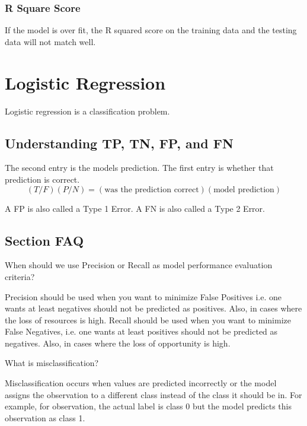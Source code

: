 	\subsubsection{R Square Score}
If the model is over fit, the R squared score on the training data and the testing data will not match well.


	\section{Logistic Regression}
Logistic regression is a classification problem.

	\subsection{Understanding TP, TN, FP, and FN}
The second entry is the models prediction.  The first entry is whether that prediction is correct.
	\begin{equation}
		(T/F)(P/N) = (\textrm{was the prediction correct})(\textrm{model prediction})
	\end{equation}

A FP is also called a Type 1 Error.  A FN is also called a Type 2 Error.

	\subsection{Section FAQ}

	\resetquestioncounter{}
    \begin{qanda}
		\begin{question}
When should we use Precision or Recall as model performance evaluation criteria?
		\end{question}

		\begin{answer}
Precision should be used when you want to minimize False Positives i.e. one wants at least negatives should not be predicted as positives. Also, in cases where the loss of resources is high.  Recall should be used when you want to minimize False Negatives, i.e. one wants at least positives should not be predicted as negatives. Also, in cases where the loss of opportunity is high.
		\end{answer}
    \end{qanda}

    \begin{qanda}
		\begin{question}
What is misclassification?
		\end{question}

		\begin{answer}
Misclassification occurs when values are predicted incorrectly or the model assigns the observation to a different class instead of the class it should be in. For example, for observation, the actual label is class 0 but the model predicts this observation as class 1.%
		\end{answer}
    \end{qanda}

